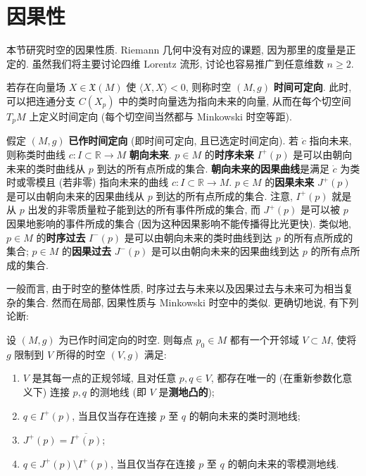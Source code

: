 \section{因果性}\label{sec:causality-in-lorentzian-manifolds}

本节研究时空的因果性质. Riemann 几何中没有对应的课题, 因为那里的度量是正定的. 虽然我们将主要讨论四维 Lorentz 流形, 讨论也容易推广到任意维数 $n\geq2$.

若存在向量场 $X\in\mathfrak{X}(M)$ 使 $\langle X,X\rangle<0$, 则称时空 $(M,g)$ \textbf{时间可定向}. 此时, 可以把连通分支 $C(X_p)$ 中的类时向量选为指向未来的向量, 从而在每个切空间 $T_pM$ 上定义时间定向 (每个切空间当然都与 Minkowski 时空等距).

假定 $(M,g)$ \textbf{已作时间定向} (即时间可定向, 且已选定时间定向). 若 $\dot c$ 指向未来, 则称类时曲线 $c:I\subset\mathbb{R}\to M$ \textbf{朝向未来}. $p\in M$ 的\textbf{时序未来} $I^+(p)$ 是可以由朝向未来的类时曲线从 $p$ 到达的所有点所成的集合. \textbf{朝向未来的因果曲线}是满足 $\dot c$ 为类时或零模且 (若非零) 指向未来的曲线 $c:I\subset\mathbb{R}\to M$. $p\in M$ 的\textbf{因果未来} $J^+(p)$ 是可以由朝向未来的因果曲线从 $p$ 到达的所有点所成的集合. 注意, $I^+(p)$ 就是从 $p$ 出发的非零质量粒子能到达的所有事件所成的集合, 而 $J^+(p)$ 是可以被 $p$ 因果地影响的事件所成的集合 (因为这种因果影响不能传播得比光更快). 类似地, $p\in M$ 的\textbf{时序过去} $I^-(p)$ 是可以由朝向未来的类时曲线到达 $p$ 的所有点所成的集合; $p\in M$ 的\textbf{因果过去} $J^-(p)$ 是可以由朝向未来的因果曲线到达 $p$ 的所有点所成的集合.

一般而言, 由于时空的整体性质, 时序过去与未来以及因果过去与未来可为相当复杂的集合. 然而在局部, 因果性质与 Minkowski 时空中的类似. 更确切地说, 有下列论断:

\begin{RiemannProposition}\label{prop:local-causal-structure-in-convex-normal-neighborhood}
设 $(M,g)$ 为已作时间定向的时空. 则每点 $p_0\in M$ 都有一个开邻域 $V\subset M$, 使将 $g$ 限制到 $V$ 所得的时空 $(V,g)$ 满足:
\begin{enumerate}[label=(\arabic*),ref=\arabic*,leftmargin=*]
\item\label{cond:geodesically-convex-normal-neighborhood}
$V$ 是其每一点的正规邻域, 且对任意 $p,q\in V$, 都存在唯一的 (在重新参数化意义下) 连接 $p,q$ 的测地线 (即 $V$ 是\textbf{测地凸的});
\item\label{cond:local-chronological-future-via-timelike-geodesics}
$q\in I^+(p)$, 当且仅当存在连接 $p$ 至 $q$ 的朝向未来的类时测地线;
\item\label{cond:local-causal-future-is-chronological-closure}
$J^+(p)=\overline{I^+(p)}$;
\item\label{cond:local-boundary-via-null-geodesics}
$q\in J^+(p)\setminus I^+(p)$, 当且仅当存在连接 $p$ 至 $q$ 的朝向未来的零模测地线.
\end{enumerate}
\end{RiemannProposition}


